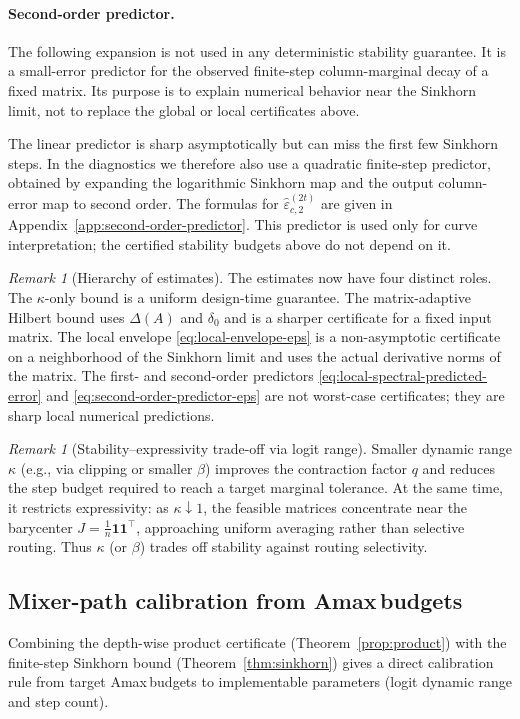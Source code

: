 \documentclass[11pt]{article}
\numberwithin{equation}{section}
\theoremstyle{plain}
\theoremstyle{definition}
\theoremstyle{remark}
\newtheorem{remark}[theorem]{Remark}
\newcommand{\ones}{\mathbf{1}}
\newcommand{\Amax}{\textsf{Amax}\,}
\begin{document}
\paragraph{Second-order predictor.}
The following expansion is not used in any deterministic stability guarantee.
It is a small-error predictor for the observed finite-step column-marginal decay
of a fixed matrix.  Its purpose is to explain numerical behavior near the
Sinkhorn limit, not to replace the global or local certificates above.

The linear predictor is sharp asymptotically but can miss the first few Sinkhorn
steps.  In the diagnostics we therefore also use a quadratic finite-step
predictor, obtained by expanding the logarithmic Sinkhorn map and the output
column-error map to second order.  The formulas for
\(\widehat\varepsilon_{c,2}^{(2t)}\) are given in
Appendix~\ref{app:second-order-predictor}.  This predictor is used only for
curve interpretation; the certified stability budgets above do not depend on it.

\begin{remark}[Hierarchy of estimates]
The estimates now have four distinct roles. The $\kappa$-only bound is a uniform design-time guarantee. The matrix-adaptive Hilbert bound uses $\Delta(A)$ and $\delta_0$ and is a sharper certificate for a fixed input matrix. The local envelope \eqref{eq:local-envelope-eps} is a non-asymptotic certificate on a neighborhood of the Sinkhorn limit and uses the actual derivative norms of the matrix. The first- and second-order predictors \eqref{eq:local-spectral-predicted-error} and \eqref{eq:second-order-predictor-eps} are not worst-case certificates; they are sharp local numerical predictions.
\end{remark}

\begin{remark}[Stability--expressivity trade-off via logit range]\label{rem:tradeoff}
Smaller dynamic range $\kappa$ (e.g., via clipping or smaller $\beta$) improves the contraction factor $q$ and reduces the step budget required to reach a target marginal tolerance. At the same time, it restricts expressivity: as $\kappa\downarrow 1$,
the feasible matrices concentrate near the barycenter $J=\tfrac1n\ones\ones^\top$, approaching uniform averaging rather than selective routing. Thus $\kappa$ (or $\beta$) trades off stability against routing selectivity.
\end{remark}

\subsection{Mixer-path calibration from \Amax budgets}\label{subsec:scheme}
Combining the depth-wise product certificate (Theorem~\ref{prop:product}) with the finite-step Sinkhorn bound (Theorem~\ref{thm:sinkhorn}) gives a direct calibration rule from target \Amax budgets to implementable parameters (logit dynamic range and step count).
\end{document}
